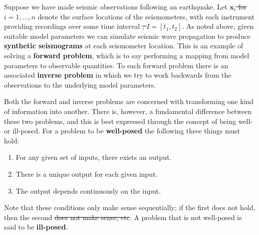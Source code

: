 \documentclass [a4paper,12pt]{paper}
\providecommand{\DIFadd}[1]{{\protect\color{blue}\uwave{#1}}} %
\providecommand{\DIFdel}[1]{{\protect\color{red}\sout{#1}}}                      %
\providecommand{\DIFaddbegin}{} %
\providecommand{\DIFaddend}{} %
\providecommand{\DIFdelbegin}{} %
\providecommand{\DIFdelend}{} %
\begin{document}
Suppose we have made seismic observations following an earthquake. Let \DIFdelbegin \DIFdel{$\mathbf{x}_i$ for $i=1, ..., n$ }\DIFdelend \DIFaddbegin \DIFadd{$\mathbf{x}^{(k)}$, $k=1,\dots,n$, }\DIFaddend denote the surface locations
of the seismometers, with each instrument providing recordings over some time interval \DIFdelbegin \DIFdel{, $I = [t_1, t_2]$}\DIFdelend \DIFaddbegin \DIFadd{$[t_1, t_2]$}\DIFaddend . As noted above, given 
suitable model parameters we can simulate seismic wave propagation to produce \textbf{synthetic seismograms} at each seismometer location. 
This is an example of solving a \textbf{forward problem}, which is to say performing a mapping from model parameters to observable quantities. 
To each forward problem there is an associated \textbf{inverse problem} in which we try to work backwards from the observations to the 
underlying model parameters.

Both the forward and inverse problems are concerned with transforming one kind of information into another. There is, however, a 
fundamental difference between these two problems, and this is best expressed through the concept of being well- or ill-posed. For a 
problem to be \textbf{well-posed}
the following three things must hold:
\begin{enumerate}
    \item For any given set of inputs, there exists an output.
    \item There is a unique output for each given input.
    \item The output depends continuously on the input.
\end{enumerate}
Note that these conditions only make sense sequentially; if the first does not hold, then the second \DIFdelbegin \DIFdel{does not make sense, etc}\DIFdelend \DIFaddbegin \DIFadd{is meaningless, and so on}\DIFaddend . A 
problem that is not well-posed is said to be \textbf{ill-posed}. 
\end{document}
